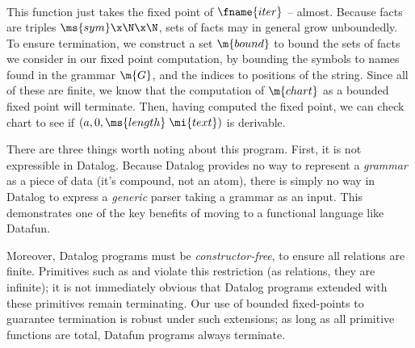 \[\begin{array}{l}
\end{array}\]
This function just takes the fixed point of $\fname{iter}$ --
almost. Because facts are triples $\ms{sym} \x \N \x \N$, sets of
facts may in general grow unboundedly.  To ensure termination, we
construct a set $\m{bound}$ to bound the sets of facts we consider in
our fixed point computation, by bounding the symbols to names found in
the grammar $\m{G}$, and the indices to positions of the string. Since
all of these are finite, we know that the computation of $\m{chart}$
as a bounded fixed point will terminate. Then, having computed the
fixed point, we can check chart to see if $(a, 0, \ms{length}\;\mi{text})$
is derivable.

There are three things worth noting about this program. First, it is
not expressible in Datalog. Because Datalog provides no way to
represent a \emph{grammar} as a piece of data (it's compound, not an
atom), there is simply no way in Datalog to express a \emph{generic}
parser taking a grammar as an input. This demonstrates one of the key
benefits of moving to a functional language like Datafun.

Moreover, Datalog programs must be \emph{constructor-free}, to ensure all
relations are finite. Primitives such as  and  violate
this restriction (as relations, they are infinite); it is not immediately
obvious that Datalog programs extended with these primitives remain terminating.
Our use of bounded fixed-points to guarantee termination is robust under such
extensions; as long as all primitive functions are total, Datafun programs
always terminate.

